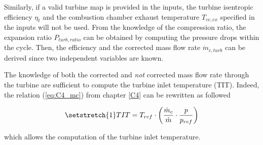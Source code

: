 Similarly, if a valid turbine map is provided in the inputs, the turbine isentropic efficiency $\eta_{t}$ and the combustion chamber exhaust temperature $T_{cc,ex}$ specified in the inputs will not be used. From the knowledge of the compression ratio, the expansion ratio $P_{turb,ratio}$ can be obtained by computing the pressure drops within the cycle. Then, the efficiency and the corrected mass flow rate $\dot{m}_{c,turb}$ can be derived since two independent variables are known.

The knowledge of both the corrected and \textit{not} corrected mass flow rate through the turbine are sufficient to compute the turbine inlet temperature (TIT). Indeed, the relation (\ref{eq:C4_mc}) from chapter \ref{C4} can be rewritten as followed

\begin{equation}
    \setstretch{1}
TIT =T_{ref}\cdot \left(\frac{\dot{m}_c}{\dot{m}}\cdot\frac{p}{p_{ref}}\right)
\end{equation} 

which allows the computation of the turbine inlet temperature.
\newpage
